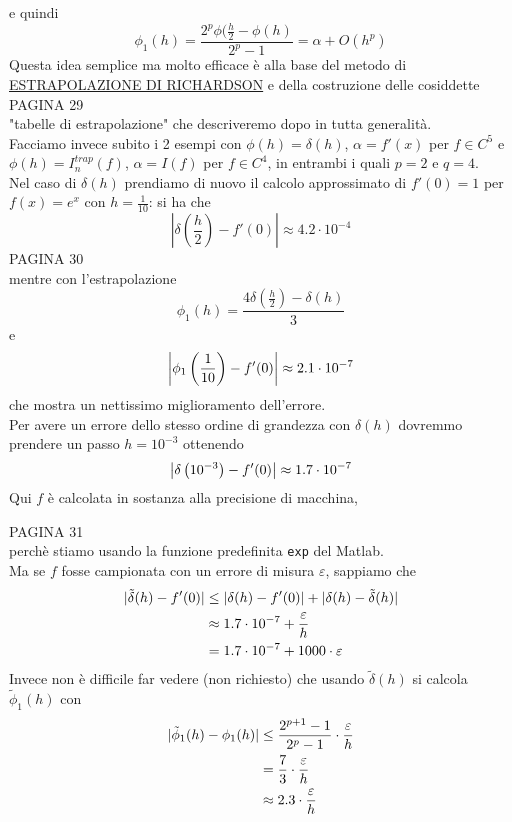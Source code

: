 \documentclass[12pt,a4paper]{article}
\DeclarePairedDelimiter{\abs}{\lvert}{\rvert}
\begin{document}
e quindi
\begin{equation*}
    \phi_1(h)=\frac{2^p\phi(\frac{h}{2}-\phi(h)}{2^p-1}=\alpha+O(h^p)
\end{equation*}
Questa idea semplice ma molto efficace è alla base del metodo di \underline{ESTRAPOLAZIONE DI RICHARDSON} e della costruzione delle cosiddette\\
PAGINA 29\\
"tabelle di estrapolazione" che descriveremo dopo in tutta generalità.\\Facciamo invece subito i 2 esempi con $\phi(h)=\delta(h)$, $\alpha=f'(x)$ per $f\in C^5$ e $\phi(h)=I_n^{trap}(f)$, $\alpha=I(f)$ per $f\in C^4$, in entrambi i quali $p=2$ e $q=4$.\\Nel caso di $\delta(h)$ prendiamo di nuovo il calcolo approssimato di $f'(0)=1$ per $f(x)=e^x$ con $h=\frac{1}{10}$: si ha che 
\begin{equation*}
    |\delta(\frac{h}{2})-f'(0)|\approx4.2\cdot 10^{-4}
\end{equation*}
PAGINA 30 \\%
mentre con l'estrapolazione
\[\phi_1(h) = \frac{4\delta \left( \frac{h}{2} \right) - \delta(h)}{3}\] e
\[ \abs*{\phi_1 \left(\frac{1}{10}\right) - f'(0)} \approx 2.1 \cdot 10^{-7}\]
che mostra un nettissimo miglioramento dell'errore. \\
Per avere un errore dello stesso ordine di grandezza con $\delta(h)$ dovremmo prendere un passo $h = 10^{-3}$ ottenendo
\[ \abs*{\delta \left(10^{-3}\right) - f'(0)} \approx 1.7 \cdot 10^{-7}\]
Qui $f$ è calcolata in sostanza alla precisione di macchina,

PAGINA 31 \\%
perchè stiamo usando la funzione predefinita \texttt{exp} del Matlab.\\
Ma se $f$ fosse campionata con un errore di misura $\varepsilon$, sappiamo che
\[\begin{split}
    \abs{\tilde{\delta}(h) - f'(0)} & \le \abs{\delta(h) - f'(0)} + \abs{\delta(h) - \tilde{\delta}(h)} \\
    & \approx 1.7 \cdot 10^{-7} + \frac{\varepsilon}{h} \\
    & = 1.7 \cdot 10^{-7} + 1000 \cdot \varepsilon
\end{split}\]
Invece non è difficile far vedere (non richiesto) che usando $\tilde{\delta}(h)$ si calcola $\tilde{\phi}_1 (h)$ con
\[\begin{split}
    \abs{\tilde{\phi}_1 (h) - \phi_1(h)} & \le \frac{2^{p+1} - 1}{2^p-1}\cdot \frac{\varepsilon}{h} \\
    & = \frac{7}{3} \cdot \frac{\varepsilon}{h} \\
    & \approx 2.3 \cdot \frac{\varepsilon}{h}
\end{split}\]
\end{document}
